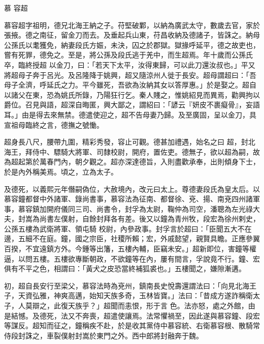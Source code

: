 
\begin{pinyinscope}

 慕
 容超



 慕容超字祖明，德兄北海王納之子。苻堅破鄴，以納為廣武太守，數歲去官，家於張掖。德之南征，留金刀而去。及垂起兵山東，苻昌收納及德諸子，皆誅之。納母公孫氏以耄獲免，納妻段氏方娠，未決，囚之於郡獄。獄掾呼延平，德之故吏也，嘗有死罪，德免之。至是，將公孫及段氏逃于羌中，而生超焉。年十歲而公孫氏卒，臨終授超
 以金刀，曰：「若天下太平，汝得東歸，可以此刀還汝叔也。」平又將超母子奔于呂光。及呂隆降于姚興，超又隨涼州人徙于長安。超母謂超曰：「吾母子全濟，呼延氏之力。平今雖死，吾欲為汝納其女以答厚惠。」於是娶之。超自以諸父在東，恐為姚氏所錄，乃陽狂行乞。秦人賤之，惟姚紹見而異焉，勸興拘以爵位。召見與語，超深自晦匿，興大鄙之，謂紹曰：「諺云『妍皮不裹癡骨』，妄語耳。」由是得去來無禁。德遣使迎之，超不告母妻乃歸。及至廣固，呈以金刀，具宣祖母臨終之言，德撫之號慟。



 超身長八尺，腰帶九圍，精彩秀發，容止可觀。德甚加禮遇，始名之曰
 超，封北海王，拜侍中、驃騎大將軍、司隸校尉，開府，置佐吏。德無子，欲以超為嗣，故為超起第於萬春門內，朝夕觀之。超亦深達德旨，入則盡歡承奉，出則傾身下士，於是內外稱美焉。頃之，立為太子。



 及德死，以義熙元年僭嗣偽位，大赦境內，改元曰太上。尊德妻段氏為皇太后。以慕容鐘都督中外諸軍、錄尚書事，慕容法為征南、都督徐、兗、揚、南兗四州諸軍事，慕容鎮加開府儀同三司、尚書令，封孚為太尉，鞠仲為司空，潘聰為左光祿大夫，封嵩為尚書左僕射，自餘封拜各有差。後又以鐘為青州牧，段宏為徐州剌史，公孫五樓為武衛將軍、領屯騎
 校尉，內參政事。封孚言於超曰：「臣聞五大不在邊，五細不在庭。鐘，國之宗臣，社稷所賴；宏，外戚懿望，親賢具瞻。正應參翼百揆，不宜遠鎮方外。今鍾等出籓，五樓內輔，臣竊未安。」超新即位，害鐘等權逼，以問五樓。五樓欲專斷朝政，不欲鐘等在內，屢有間言，孚說竟不行。鐘、宏俱有不平之色，相謂曰：「黃犬之皮恐當終補狐裘也。」五樓聞之，嫌隙漸遘。



 初，超自長安行至梁父，慕容法時為兗州，鎮南長史悅壽還謂法曰：「向見北海王子，天資弘雅，神爽高邁，始知天族多奇，玉林皆寶。」法曰：「昔成方遂詐稱衛太子，人莫辯之，此復天族乎？」超聞而恚恨，形于言
 色。法亦怒，處之外館，由是結憾。及德死，法又不奔喪，超遣使讓焉。法常懼禍至，因此遂與慕容鐘、段宏等謀反。超知而征之，鐘稱疾不赴，於是收其黨侍中慕容統、右衛慕容根、散騎常侍段封誅之，車裂僕射封嵩於東門之外。西中郎將封融奔于魏。




\end{pinyinscope}
